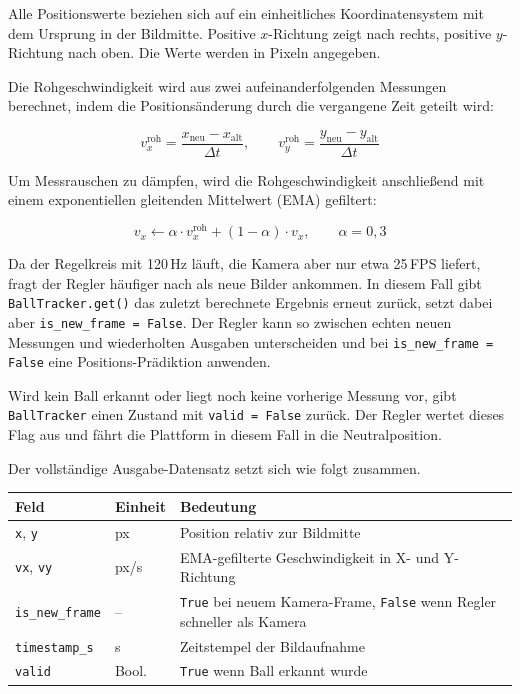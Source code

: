 \documentclass[11pt, a4paper]{scrreprt}
\begin{document}
Alle Positionswerte beziehen sich auf ein einheitliches Koordinatensystem
mit dem Ursprung in der Bildmitte. Positive $x$-Richtung zeigt nach rechts,
positive $y$-Richtung nach oben. Die Werte werden in Pixeln angegeben.

Die Rohgeschwindigkeit wird aus zwei aufeinanderfolgenden Messungen berechnet,
indem die Positionsänderung durch die vergangene Zeit geteilt wird:

\[
  v_x^{\text{roh}} = \frac{x_{\text{neu}} - x_{\text{alt}}}{\Delta t}, \qquad
  v_y^{\text{roh}} = \frac{y_{\text{neu}} - y_{\text{alt}}}{\Delta t}
\]

Um Messrauschen zu dämpfen, wird die Rohgeschwindigkeit anschließend mit einem
exponentiellen gleitenden Mittelwert (EMA) gefiltert:

\[
  v_x \leftarrow \alpha \cdot v_x^{\text{roh}} + (1 - \alpha) \cdot v_x, \qquad \alpha = 0{,}3
\]

Da der Regelkreis mit 120\,Hz läuft, die Kamera aber nur etwa 25\,FPS liefert,
fragt der Regler häufiger nach als neue Bilder ankommen. In diesem Fall gibt
\texttt{BallTracker.get()} das zuletzt berechnete Ergebnis erneut zurück,
setzt dabei aber \texttt{is\_new\_frame = False}. Der Regler kann so zwischen
echten neuen Messungen und wiederholten Ausgaben unterscheiden und bei
\texttt{is\_new\_frame = False} eine Positions-Prädiktion anwenden.

Wird kein Ball erkannt oder liegt noch keine vorherige Messung vor,
gibt \texttt{BallTracker} einen Zustand mit \texttt{valid = False} zurück.
Der Regler wertet dieses Flag aus und fährt die Plattform in diesem Fall
in die Neutralposition.

Der vollständige Ausgabe-Datensatz setzt sich wie folgt zusammen.

\begin{center}
\begin{tabular}{lll}
  \toprule
  Feld & Einheit & Bedeutung \\
  \midrule
  \texttt{x}, \texttt{y}         & px    & Position relativ zur Bildmitte \\
  \texttt{vx}, \texttt{vy}       & px/s  & EMA-gefilterte Geschwindigkeit in X- und Y-Richtung \\
  \texttt{is\_new\_frame}        & –     & \texttt{True} bei neuem Kamera-Frame, \texttt{False} wenn Regler schneller als Kamera \\
  \texttt{timestamp\_s}          & s     & Zeitstempel der Bildaufnahme \\
  \texttt{valid}                 & Bool. & \texttt{True} wenn Ball erkannt wurde \\
  \bottomrule
\end{tabular}
\end{center}
\end{document}
